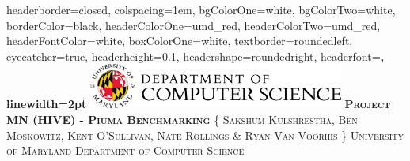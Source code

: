\documentclass[landscape,a0paper,fontscale=0.285]{baposter} %
\begin{document}
\begin{poster}
{
headerborder=closed, %
colspacing=1em, %
bgColorOne=white, %
bgColorTwo=white, %
borderColor=black, %
headerColorOne=umd_red, %
headerColorTwo=umd_red, %
headerFontColor=white, %
boxColorOne=white, %
textborder=roundedleft, %
eyecatcher=true, %
headerheight=0.1\textheight, %
headershape=roundedright, %
headerfont=\Large\bf\textsc, %
linewidth=2pt %
}
%
{\includegraphics[height=4em]{umd_logo.png}} %
{\bf\textsc{Project MN (HIVE) - Piuma Benchmarking}\vspace{0.5em}} %
{\textsc{\{ Sakshum Kulshrestha, Ben Moskowitz, Kent O'Sullivan, Nate Rollings \& Ryan Van Voorhis \} \hspace{12pt} University of Maryland Department of Computer Science}} %



\end{poster}
\end{document}
